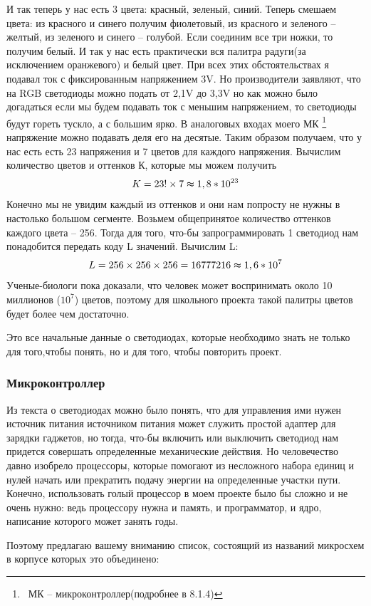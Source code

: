 \documentclass[a4paper, 12pt]{article}
\begin{document}
И так теперь у нас есть 3 цвета: красный, зеленый, синий.
Теперь смешаем цвета: из красного и синего получим фиолетовый,
из красного и зеленого -- желтый, из зеленого и синего -- голубой.
Если соединим все три ножки, то получим белый.
И так у нас есть практически вся палитра радуги(за исключением оранжевого)
и белый цвет. При всех этих обстоятельствах я подавал ток с фиксированным напряжением
3V. Но производители заявляют, что на RGB светодиоды можно подать от 2,1V до 3,3V но
как можно было догадаться если мы будем подавать ток с меньшим напряжением, то светодиоды
будут гореть тускло, а с большим ярко. В аналоговых входах моего МК
\footnote{\ МК -- микроконтроллер(подробнее в 8.1.4)}
напряжение можно подавать деля его на десятые. Таким образом получаем, что у 
нас есть есть 23 напряжения и 7 цветов для каждого напряжения. Вычислим 
количество цветов и оттенков К, которые мы можем получить $$K=23!\times 
7\thickapprox 1,8*10^{23}$$ Конечно мы не увидим каждый из оттенков и они нам 
попросту не нужны в настолько большом сегменте. Возьмем общепринятое количество 
оттенков каждого цвета -- 256. Тогда для того, что-бы запрограммировать 1 
светодиод нам понадобится передать коду L значений. Вычислим L: $$L=256\times 
256\times 256= 16777216 \thickapprox 1,6*10^7$$ Ученые-биологи пока доказали, 
что человек может воспринимать около 10 миллионов ($10^7$) цветов, поэтому для 
школьного проекта такой палитры цветов будет более чем достаточно.

Это все начальные данные о светодиодах, которые необходимо знать не только для 
того,чтобы понять, но и для того, чтобы повторить проект.

\subsubsection{Микроконтроллер}

Из текста о светодиодах можно было понять, что для управления ими нужен 
источник питания источником питания может служить простой адаптер для зарядки 
гаджетов, но тогда, что-бы включить или выключить светодиод нам придется 
совершать определенные механические действия. Но человечество давно изобрело 
процессоры, которые помогают из несложного набора единиц и нулей начать или 
прекратить подачу энергии на определенные участки пути. Конечно, использовать 
голый процессор в моем проекте было бы сложно и не очень нужно: ведь процессору 
нужна и память, и программатор, и ядро, написание которого может занять годы.

Поэтому предлагаю вашему вниманию список, состоящий из названий микросхем в 
корпусе которых это объединено:
\end{document}
